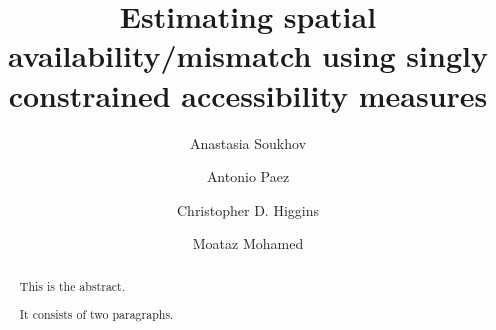 \documentclass[]{elsarticle} %
\begin{document}
\begin{frontmatter}

  \title{Estimating spatial availability/mismatch using singly
constrained accessibility measures}
    \author[SEES]{Anastasia Soukhov}
    \author[SEES]{Antonio Paez}
    \author[UofTS]{Christopher D. Higgins}
    \author[CIVENG]{Moataz Mohamed}
      \address[SEES]{School of Earth, Environment and Society, McMaster
University, Hamilton, ON, L8S 4K1, Canada}
    \address[University of Toronto Scarborough]{Department of Geography
\& Planning, University of Toronto Scarborough, 1265 Military Trail,
Toronto, ON M1C1A4}
    \address[CIVENG]{Dept. of Civil Engineering, McMaster University,
Hamilton, ON, L8S 4K1, Canada}
  
  \begin{abstract}
  This is the abstract.

  It consists of two paragraphs.
  \end{abstract}
  
 \end{frontmatter}
\end{document}
